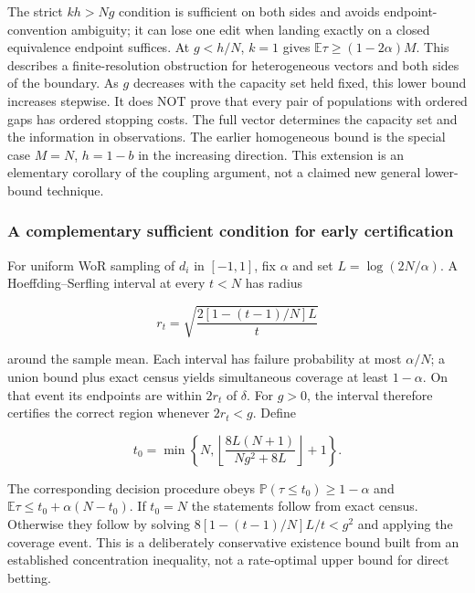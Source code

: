 The strict \(kh>Ng\) condition is sufficient on both sides and avoids endpoint-convention ambiguity; it can lose one edit when landing exactly on a closed equivalence endpoint suffices. At \(g<h/N\), \(k=1\) gives \(\mathbb E\tau\ge(1-2\alpha)M\). This describes a finite-resolution obstruction for heterogeneous vectors and both sides of the boundary. As \(g\) decreases with the capacity set held fixed, this lower bound increases stepwise. It does NOT prove that every pair of populations with ordered gaps has ordered stopping costs. The full vector determines the capacity set and the information in observations. The earlier homogeneous bound is the special case \(M=N\), \(h=1-b\) in the increasing direction. This extension is an elementary corollary of the coupling argument, not a claimed new general lower-bound technique.

\subsubsection{A complementary sufficient condition for early certification}\label{a-complementary-sufficient-condition-for-early-certification}

For uniform WoR sampling of \(d_i\) in \([-1,1]\), fix \(\alpha\) and set \(L=\log(2N/\alpha)\). A Hoeffding--Serfling interval at every \(t<N\) has radius

\begin{equation}\label{eq:proofs-10}
r_t=\sqrt{\frac{2[1-(t-1)/N]L}{t}}
\end{equation}

around the sample mean. Each interval has failure probability at most \(\alpha/N\); a union bound plus exact census yields simultaneous coverage at least \(1-\alpha\). On that event its endpoints are within \(2r_t\) of \(\delta\). For \(g>0\), the interval therefore certifies the correct region whenever \(2r_t<g\). Define

\begin{equation}\label{eq:proofs-11}
t_0=\min\left\{N,\left\lfloor\frac{8L(N+1)}{Ng^2+8L}\right\rfloor+1\right\}.
\end{equation}

The corresponding decision procedure obeys \(\mathbb P(\tau\le t_0)\ge1-\alpha\) and \(\mathbb E\tau\le t_0+\alpha(N-t_0)\). If \(t_0=N\) the statements follow from exact census. Otherwise they follow by solving \(8[1-(t-1)/N]L/t<g^2\) and applying the coverage event. This is a deliberately conservative existence bound built from an established concentration inequality, not a rate-optimal upper bound for direct betting.

